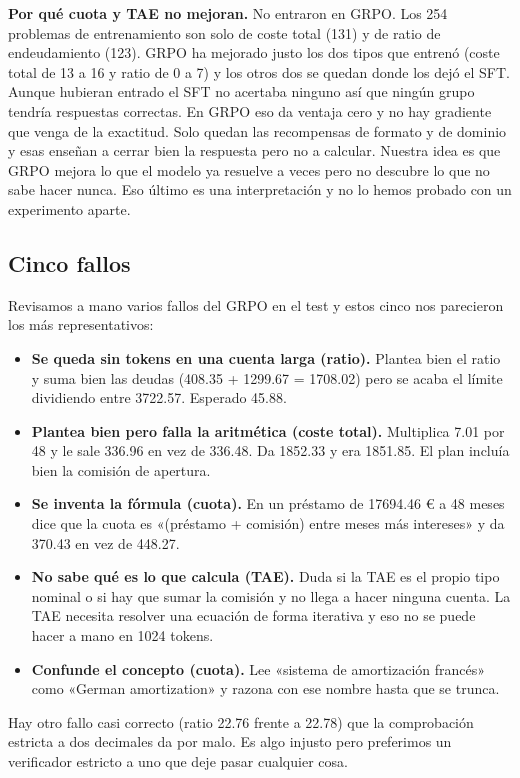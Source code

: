 \documentclass[10pt,a4paper]{article}
\begin{document}
\textbf{Por qué cuota y TAE no mejoran.} No entraron en GRPO. Los 254 problemas de entrenamiento son solo de coste total (131) y de ratio de endeudamiento (123).
GRPO ha mejorado justo los dos tipos que entrenó (coste total de 13 a 16 y ratio de 0 a 7) y los otros dos se quedan donde los dejó el SFT.
Aunque hubieran entrado el SFT no acertaba ninguno así que ningún grupo tendría respuestas correctas. En GRPO eso da ventaja cero y no hay gradiente que venga de la exactitud.
Solo quedan las recompensas de formato y de dominio y esas enseñan a cerrar bien la respuesta pero no a calcular. Nuestra idea es que GRPO mejora lo que el modelo ya resuelve a veces pero no descubre lo que no sabe hacer nunca.
Eso último es una interpretación y no lo hemos probado con un experimento aparte.

\subsection*{Cinco fallos}
Revisamos a mano varios fallos del GRPO en el test y estos cinco nos parecieron los más representativos:
\begin{itemize}
\item \textbf{Se queda sin tokens en una cuenta larga (ratio).} Plantea bien el ratio y suma bien las deudas (408.35 + 1299.67 = 1708.02) pero se acaba el límite dividiendo entre 3722.57. Esperado 45.88.
\item \textbf{Plantea bien pero falla la aritmética (coste total).} Multiplica 7.01 por 48 y le sale 336.96 en vez de 336.48. Da 1852.33 y era 1851.85. El plan incluía bien la comisión de apertura.
\item \textbf{Se inventa la fórmula (cuota).} En un préstamo de 17694.46 € a 48 meses dice que la cuota es «(préstamo + comisión) entre meses más intereses» y da 370.43 en vez de 448.27.
\item \textbf{No sabe qué es lo que calcula (TAE).} Duda si la TAE es el propio tipo nominal o si hay que sumar la comisión y no llega a hacer ninguna cuenta. La TAE necesita resolver una ecuación de forma iterativa y eso no se puede hacer a mano en 1024 tokens.
\item \textbf{Confunde el concepto (cuota).} Lee «sistema de amortización francés» como «German amortization» y razona con ese nombre hasta que se trunca.
\end{itemize}
Hay otro fallo casi correcto (ratio 22.76 frente a 22.78) que la comprobación estricta a dos decimales da por malo. Es algo injusto pero preferimos un verificador estricto a uno que deje pasar cualquier cosa.
\end{document}
